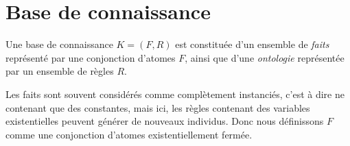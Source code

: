
\section{Base de connaissance}\label{def_base}
Une base de connaissance $K = (F,R)$ 
est constituée d'un ensemble de {\em faits} représenté
par une conjonction d'atomes $F$, ainsi que d'une {\em ontologie} représentée 
par un ensemble de règles $R$.

Les faits sont souvent considérés comme complètement instanciés, c'est à dire ne
contenant que des constantes, mais ici, les règles contenant des variables existentielles
peuvent générer de nouveaux individus. Donc nous définissons $F$ comme une conjonction
d'atomes existentiellement fermée.




